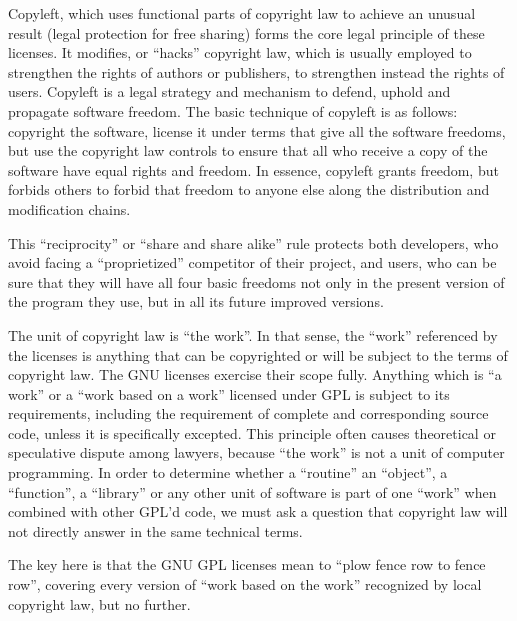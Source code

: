 \label{copyleft-definition}


Copyleft,
which uses functional parts of copyright law to achieve an unusual result
(legal protection for free sharing) forms the core legal principle of these
licenses. It modifies, or ``hacks'' copyright law, which is usually employed to
strengthen the rights of authors or publishers, to strengthen instead the
rights of users.   %
Copyleft is a legal strategy and mechanism to defend, uphold and propagate software
freedom. The basic technique of copyleft is as follows: copyright the
software, license it under terms that give all the software freedoms, but
use the copyright law controls to ensure that all who receive a copy of
the software have equal rights and freedom. In essence, copyleft grants
freedom, but forbids others to forbid that freedom to anyone else along
the distribution and modification chains.


This ``reciprocity'' or ``share and share alike'' rule protects both
developers, who avoid facing a ``proprietized'' competitor of their project,
and users, who can be sure that they will have all four basic freedoms not
only in the present version of the program they use, but in all its future
improved versions.


The unit of copyright law is ``the work''. In that sense, the ``work''
referenced by the licenses is anything that can be copyrighted or will be
subject to the terms of copyright law. The GNU licenses exercise their scope
fully. Anything which is ``a work'' or a ``work based on a work'' licensed
under GPL is subject to its requirements, including the requirement of
complete and corresponding source code, unless it is specifically
excepted. This principle often causes theoretical or speculative dispute
among lawyers, because ``the work'' is not a unit of computer programming. In
order to determine whether a ``routine'' an ``object'', a ``function'', a
``library'' or any other unit of software is part of one ``work'' when combined
with other GPL’d code, we must ask a question that copyright law will not
directly answer in the same technical terms.

The key here is that the GNU GPL licenses mean to ``plow fence row to fence
row'', covering every version of ``work based on the work'' recognized by local
copyright law, but no further.

